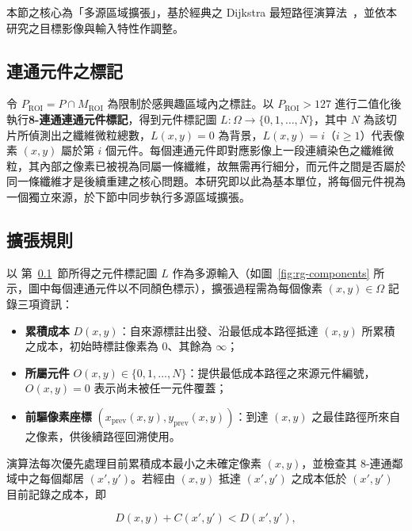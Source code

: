 本節之核心為「多源區域擴張」，基於經典之 Dijkstra 最短路徑演算法~\cite{dijkstra1959note}，並依本研究之目標影像與輸入特性作調整。

\subsection{連通元件之標記}
\label{subsec:cc}

令 $P_{\text{ROI}} = P \cap M_{\text{ROI}}$ 為限制於感興趣區域內之標註。以 $P_{\text{ROI}} > 127$ 進行二值化後執行\textbf{8-連通連通元件標記}，得到元件標記圖 $L : \Omega \to \{0, 1, \ldots, N\}$，其中 $N$ 為該切片所偵測出之纖維微粒總數，$L(x, y) = 0$ 為背景，$L(x, y) = i$（$i \ge 1$）代表像素 $(x, y)$ 屬於第 $i$ 個元件。每個連通元件即對應影像上一段連續染色之纖維微粒，其內部之像素已被視為同屬一條纖維，故無需再行細分，而元件之間是否屬於同一條纖維才是後續重建之核心問題。本研究即以此為基本單位，將每個元件視為一個獨立來源，於下節中同步執行多源區域擴張。

\subsection{擴張規則}
\label{subsec:dijkstra-rule}

以 第~\ref{subsec:cc}~節所得之元件標記圖 $L$ 作為多源輸入（如圖~\ref{fig:rg-components} 所示，圖中每個連通元件以不同顏色標示），擴張過程需為每個像素 $(x, y) \in \Omega$ 記錄三項資訊：
\begin{itemize}
  \item \textbf{累積成本} $D(x, y)$：自來源標註出發、沿最低成本路徑抵達 $(x, y)$ 所累積之成本，初始時標註像素為 $0$、其餘為 $\infty$；
  \item \textbf{所屬元件} $O(x, y) \in \{0, 1, \ldots, N\}$：提供最低成本路徑之來源元件編號，$O(x, y) = 0$ 表示尚未被任一元件覆蓋；
  \item \textbf{前驅像素座標} $(x_{\text{prev}}(x, y), y_{\text{prev}}(x, y))$：到達 $(x, y)$ 之最佳路徑所來自之像素，供後續路徑回溯使用。
\end{itemize}

\noindent 演算法每次優先處理目前累積成本最小之未確定像素 $(x, y)$，並檢查其 8-連通鄰域中之每個鄰居 $(x', y')$。若經由 $(x, y)$ 抵達 $(x', y')$ 之成本低於 $(x', y')$ 目前記錄之成本，即

\begin{equation}
  D(x, y) + C(x', y') < D(x', y'),
  \label{eq:dijkstra-update}
\end{equation}

